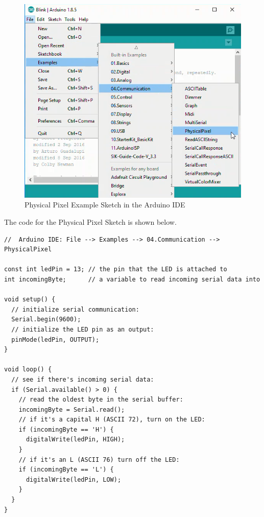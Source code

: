 \documentclass{book}
\makeatletter
\def\maxwidth{\ifdim\Gin@nat@width>\linewidth\linewidth
    \else\Gin@nat@width\fi}
\let\Oldincludegraphics\includegraphics
\renewcommand{\includegraphics}[1]{\Oldincludegraphics[width=.8\maxwidth]{#1}}
\makeatother
\begin{document}
\begin{figure}
\centering
\includegraphics{images/file-examples-communication-physicalpixel.png}
\caption{Physical Pixel Example Sketch in the Arduino IDE}
\end{figure}

The code for the Physical Pixel Sketch is shown below.
    




    
        \begin{lstlisting}
//  Arduino IDE: File --> Examples --> 04.Communication --> PhysicalPixel

const int ledPin = 13; // the pin that the LED is attached to
int incomingByte;      // a variable to read incoming serial data into

void setup() {
  // initialize serial communication:
  Serial.begin(9600);
  // initialize the LED pin as an output:
  pinMode(ledPin, OUTPUT);
}

void loop() {
  // see if there's incoming serial data:
  if (Serial.available() > 0) {
    // read the oldest byte in the serial buffer:
    incomingByte = Serial.read();
    // if it's a capital H (ASCII 72), turn on the LED:
    if (incomingByte == 'H') {
      digitalWrite(ledPin, HIGH);
    }
    // if it's an L (ASCII 76) turn off the LED:
    if (incomingByte == 'L') {
      digitalWrite(ledPin, LOW);
    }
  }
}
\end{lstlisting}
    
\end{document}
